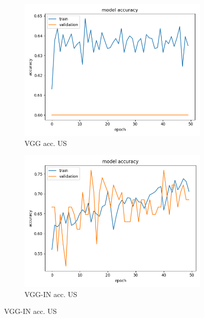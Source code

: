 \begin{figure}[h]
\begin{subfigure}[b]{.24\linewidth}
\includegraphics[width=\linewidth]{Figs/vgg_us_acc.jpg}
\caption{VGG acc. US}
\end{subfigure}
\begin{subfigure}[b]{.24\linewidth}
\includegraphics[width=\linewidth]{Figs/vgg_in_us_acc.jpg}
\caption{VGG-IN acc. US}
\end{subfigure}


\end{figure}
